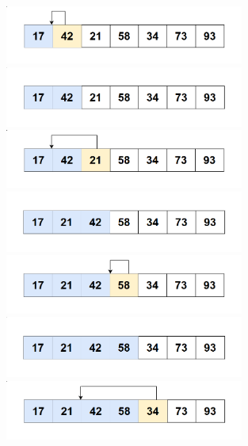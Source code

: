 \begin{figure}[H]
    \centering
    \includegraphics[width=0.7\textwidth]{img/insertion sort_lan2/2.png}
    \includegraphics[width=0.7\textwidth]{img/insertion sort_lan2/3.png}
    \includegraphics[width=0.7\textwidth]{img/insertion sort_lan2/4.png}
    \includegraphics[width=0.7\textwidth]{img/insertion sort_lan2/5.png}
    \includegraphics[width=0.7\textwidth]{img/insertion sort_lan2/6.png}
    \includegraphics[width=0.7\textwidth]{img/insertion sort_lan2/7.png}
    \includegraphics[width=0.7\textwidth]{img/insertion sort_lan2/8.png}
   
\end{figure}

